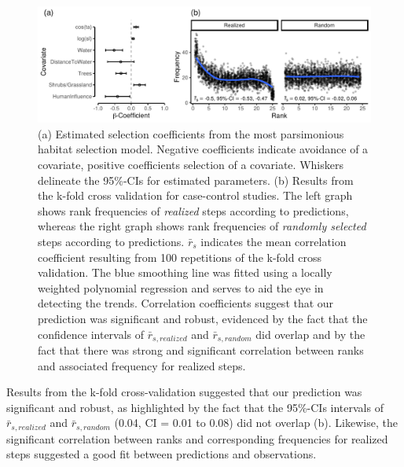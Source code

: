\documentclass[abstract=on,10pt,a4paper,bibliography=totocnumbered]{article}
\begin{document}
\begin{figure}[h]
  \begin{center}
    \includegraphics[width = \textwidth]{99_PermeabilityResults.pdf}
    \caption{(a) Estimated selection coefficients from the most parsimonious
    habitat selection model. Negative coefficients indicate avoidance of a
    covariate, positive coefficients selection of a covariate. Whiskers
    delineate the 95\%-CIs for estimated parameters. (b) Results from the k-fold
    cross validation for case-control studies. The left graph shows rank
    frequencies of \textit{realized} steps according to predictions, whereas the
    right graph shows rank frequencies of \textit{randomly selected} steps
    according to predictions. \(\bar{r}_s\) indicates the mean correlation
    coefficient resulting from 100 repetitions of the k-fold cross validation.
    The blue smoothing line was fitted using a locally weighted polynomial
    regression and serves to aid the eye in detecting the trends. Correlation
    coefficients suggest that our prediction was significant and robust,
    evidenced by the fact that the confidence intervals of \(\bar{r}_{s,
    realized}\) and \(\bar{r}_{s, random}\) did overlap and by the fact that
    there was strong and significant correlation between ranks and associated
    frequency for realized steps.}
    \label{PermeabilityResults}
  \end{center}
\end{figure}

Results from the k-fold cross-validation suggested that our prediction was
significant and robust, as highlighted by the fact that the 95\%-CIs intervals
of \(\bar{r}_{s, realized}\) and \(\bar{r}_{s, random}\) (0.04, CI = 0.01 to
0.08) did not overlap (b). Likewise, the significant
correlation between ranks and corresponding frequencies for realized steps
suggested a good fit between predictions and observations.
\end{document}
